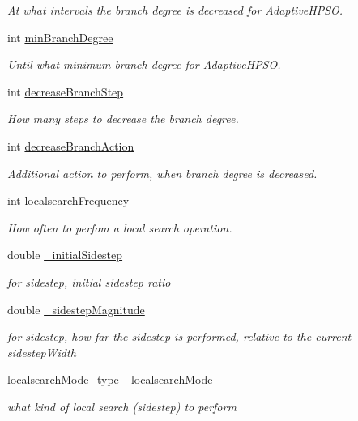 \begin{CompactItemize}
\begin{CompactList}\small\item\em At what intervals the branch degree is decreased for AdaptiveHPSO. \item\end{CompactList}\item 
int \hyperlink{classPSO_67940901b983c941c48de0a5a7b455bb}{minBranchDegree}
\begin{CompactList}\small\item\em Until what minimum branch degree for AdaptiveHPSO. \item\end{CompactList}\item 
int \hyperlink{classPSO_1eabafb61d709a3185b3465e104a189e}{decreaseBranchStep}
\begin{CompactList}\small\item\em How many steps to decrease the branch degree. \item\end{CompactList}\item 
int \hyperlink{classPSO_bc3eecdfc1be03c6bfa6b31d4ae47885}{decreaseBranchAction}
\begin{CompactList}\small\item\em Additional action to perform, when branch degree is decreased. \item\end{CompactList}\item 
int \hyperlink{classPSO_9357eeeeaa65d768dcd9c6179d8a8e9a}{localsearchFrequency}
\begin{CompactList}\small\item\em How often to perfom a local search operation. \item\end{CompactList}\item 
double \hyperlink{classPSO_b67e6a37add2bc3b1c7f2ef74873ade5}{\_\-initialSidestep}
\begin{CompactList}\small\item\em for sidestep, initial sidestep ratio \item\end{CompactList}\item 
double \hyperlink{classPSO_9bd8aa711c1550d3b0a36c4c892785ea}{\_\-sidestepMagnitude}
\begin{CompactList}\small\item\em for sidestep, how far the sidestep is performed, relative to the current sidestepWidth \item\end{CompactList}\item 
\hyperlink{pso_8h_5e93114874fd3e3df67f0db1a4212e49}{localsearchMode\_\-type} \hyperlink{classPSO_8e1a8e852e90de89cee28ad2e99ff048}{\_\-localsearchMode}
\begin{CompactList}\small\item\em what kind of local search (sidestep) to perform \item\end{CompactList}\end{CompactItemize}


